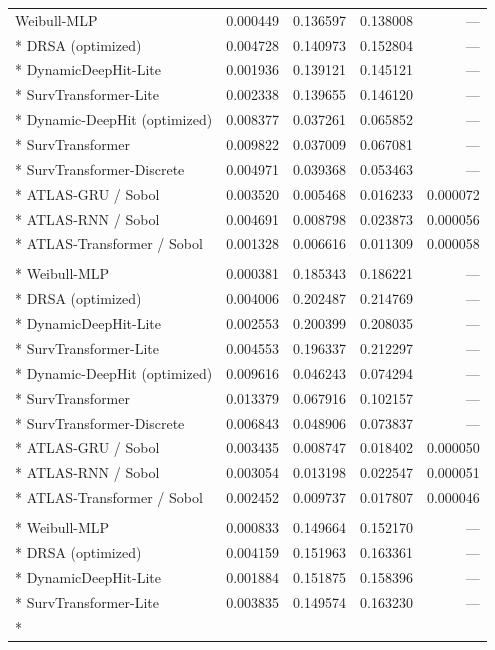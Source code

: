 \begin{longtable}{lrrrr}
Weibull-MLP & 0.000449 & 0.136597 & 0.138008 & --- \\*
DRSA (optimized) & 0.004728 & 0.140973 & 0.152804 & --- \\*
DynamicDeepHit-Lite & 0.001936 & 0.139121 & 0.145121 & --- \\*
SurvTransformer-Lite & 0.002338 & 0.139655 & 0.146120 & --- \\*
Dynamic-DeepHit (optimized) & 0.008377 & 0.037261 & 0.065852 & --- \\*
SurvTransformer & 0.009822 & 0.037009 & 0.067081 & --- \\*
SurvTransformer-Discrete & 0.004971 & 0.039368 & 0.053463 & --- \\*
ATLAS-GRU / Sobol & 0.003520 & 0.005468 & 0.016233 & 0.000072 \\*
ATLAS-RNN / Sobol & 0.004691 & 0.008798 & 0.023873 & 0.000056 \\*
ATLAS-Transformer / Sobol & 0.001328 & 0.006616 & 0.011309 & 0.000058 \\
\addlinespace
\multicolumn{5}{l}{\textit{Landmark $L=23$}}\\*
Weibull-MLP & 0.000381 & 0.185343 & 0.186221 & --- \\*
DRSA (optimized) & 0.004006 & 0.202487 & 0.214769 & --- \\*
DynamicDeepHit-Lite & 0.002553 & 0.200399 & 0.208035 & --- \\*
SurvTransformer-Lite & 0.004553 & 0.196337 & 0.212297 & --- \\*
Dynamic-DeepHit (optimized) & 0.009616 & 0.046243 & 0.074294 & --- \\*
SurvTransformer & 0.013379 & 0.067916 & 0.102157 & --- \\*
SurvTransformer-Discrete & 0.006843 & 0.048906 & 0.073837 & --- \\*
ATLAS-GRU / Sobol & 0.003435 & 0.008747 & 0.018402 & 0.000050 \\*
ATLAS-RNN / Sobol & 0.003054 & 0.013198 & 0.022547 & 0.000051 \\*
ATLAS-Transformer / Sobol & 0.002452 & 0.009737 & 0.017807 & 0.000046 \\
\addlinespace
\multicolumn{5}{l}{\textit{Landmark $L=24$}}\\*
Weibull-MLP & 0.000833 & 0.149664 & 0.152170 & --- \\*
DRSA (optimized) & 0.004159 & 0.151963 & 0.163361 & --- \\*
DynamicDeepHit-Lite & 0.001884 & 0.151875 & 0.158396 & --- \\*
SurvTransformer-Lite & 0.003835 & 0.149574 & 0.163230 & --- \\*

\end{longtable}
